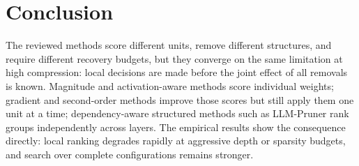 \begingroup
\def\RenderPruningReviewDiscussion{}

\endgroup



\section{Conclusion}
The reviewed methods score different units, remove different structures, and require different recovery budgets, but they converge on the same limitation at high compression: local decisions are made before the joint effect of all removals is known. Magnitude and activation-aware methods score individual weights; gradient and second-order methods improve those scores but still apply them one unit at a time; dependency-aware structured methods such as LLM-Pruner rank groups independently across layers. The empirical results show the consequence directly: local ranking degrades rapidly at aggressive depth or sparsity budgets, and search over complete configurations remains stronger.

